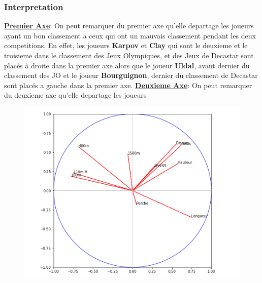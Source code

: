 \documentclass{article}
\begin{document}
\subsubsection{Interpretation}

\underline{\textbf{Premier Axe}}: On peut remarquer du premier axe qu'elle departage les joueurs ayant un bon classement a ceux qui ont un mauvais classement pendant les deux competitions.
En effet, les joueurs \textbf{Karpov} et \textbf{Clay} qui sont le deuxieme et le troisieme dans le classement des Jeux Olympiques, et des Jeux de Decastar sont placés à droite dans la premier axe alors que le joueur \textbf{Uldal}, avant dernier du classement des JO et le joueur \textbf{Bourguignon}, dernier du classement de Decastar sont placés a gauche dans la premier axe. 
\newline
\underline{\textbf{Deuxieme Axe}}: On peut remarquer du deuxieme axe qu'elle departage les joueurs  

\begin{figure}[h!]
\includegraphics[width=\linewidth]{images/cercle_cor.png}
\end{figure}
\end{document}
